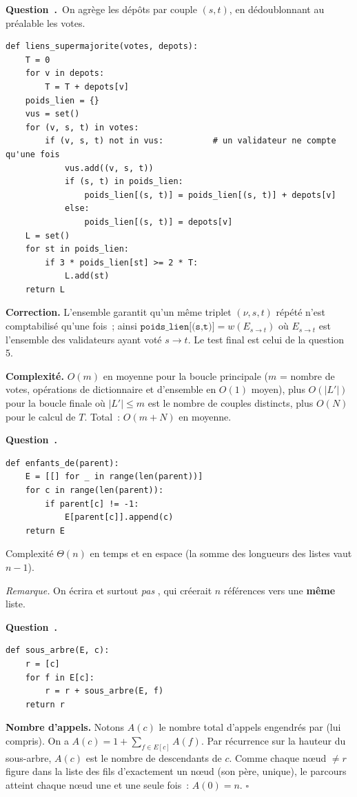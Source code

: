 \documentclass[11pt,a4paper]{article}
\renewcommand{\Q}{\medskip\par\stepcounter{qcnt}\noindent\textbf{\color{cnc}Question~\theqcnt.}~}
\begin{document}
\Q On agrège les dépôts par couple $(s,t)$, en dédoublonnant au préalable les votes.
\begin{lstlisting}
def liens_supermajorite(votes, depots):
    T = 0
    for v in depots:
        T = T + depots[v]
    poids_lien = {}
    vus = set()
    for (v, s, t) in votes:
        if (v, s, t) not in vus:          # un validateur ne compte qu'une fois
            vus.add((v, s, t))
            if (s, t) in poids_lien:
                poids_lien[(s, t)] = poids_lien[(s, t)] + depots[v]
            else:
                poids_lien[(s, t)] = depots[v]
    L = set()
    for st in poids_lien:
        if 3 * poids_lien[st] >= 2 * T:
            L.add(st)
    return L
\end{lstlisting}
\textbf{Correction.} L'ensemble  garantit qu'un même triplet $(\nu,s,t)$ répété
n'est comptabilisé qu'une fois~; ainsi $\texttt{poids\_lien[(s,t)]} = w(E_{s\to t})$ où
$E_{s\to t}$ est l'ensemble des validateurs ayant voté $s\to t$. Le test final est celui de
la question 5.

\textbf{Complexité.} $O(m)$ en moyenne pour la boucle principale ($m$ = nombre de votes,
opérations de dictionnaire et d'ensemble en $O(1)$ moyen), plus $O(|L'|)$ pour la boucle
finale où $|L'|\le m$ est le nombre de couples distincts, plus $O(N)$ pour le calcul de $T$.
Total~: $O(m+N)$ en moyenne.

\Q
\begin{lstlisting}
def enfants_de(parent):
    E = [[] for _ in range(len(parent))]
    for c in range(len(parent)):
        if parent[c] != -1:
            E[parent[c]].append(c)
    return E
\end{lstlisting}
Complexité $\Theta(n)$ en temps et en espace (la somme des longueurs des listes vaut $n-1$).

\emph{Remarque.} On écrira  et surtout \emph{pas}
, qui créerait $n$ références vers une \textbf{même} liste.

\Q
\begin{lstlisting}
def sous_arbre(E, c):
    r = [c]
    for f in E[c]:
        r = r + sous_arbre(E, f)
    return r
\end{lstlisting}
\textbf{Nombre d'appels.} Notons $A(c)$ le nombre total d'appels engendrés par
 (lui compris). On a $A(c) = 1+\sum_{f\in E[c]} A(f)$. Par récurrence
sur la hauteur du sous-arbre, $A(c)$ est le nombre de descendants de $c$. Comme chaque
n\oe ud $\ne r$ figure dans la liste des fils d'exactement un n\oe ud (son père, unique), le
parcours atteint chaque n\oe ud une et une seule fois~: $A(0)=n$. \hfill$\square$
\end{document}
